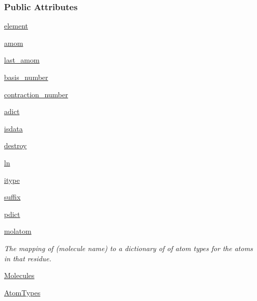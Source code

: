 \subsubsection*{Public Attributes}
\begin{DoxyCompactItemize}
\item 
\hyperlink{classforcebalance_1_1psi4io_1_1GBS__Reader_afa3e259eab3e92b51c2b064f882dd776}{element}
\item 
\hyperlink{classforcebalance_1_1psi4io_1_1GBS__Reader_a322f36949ce67389f107cac80e8f5b40}{amom}
\item 
\hyperlink{classforcebalance_1_1psi4io_1_1GBS__Reader_ae498cfab81dfd12bd0e86037be80135d}{last\-\_\-amom}
\item 
\hyperlink{classforcebalance_1_1psi4io_1_1GBS__Reader_acef6f87327455c97f05e603f9330a0d3}{basis\-\_\-number}
\item 
\hyperlink{classforcebalance_1_1psi4io_1_1GBS__Reader_a77ab2b3c48ee692e3678131c96de9708}{contraction\-\_\-number}
\item 
\hyperlink{classforcebalance_1_1psi4io_1_1GBS__Reader_ac42c3b29532e11a0d8d78b48347739ff}{adict}
\item 
\hyperlink{classforcebalance_1_1psi4io_1_1GBS__Reader_a725975a6e197a132d3c4dba96412f9bb}{isdata}
\item 
\hyperlink{classforcebalance_1_1psi4io_1_1GBS__Reader_a674b528af51d25b0c96da13946d4ea08}{destroy}
\item 
\hyperlink{classforcebalance_1_1BaseReader_a80c8e3bea212600742968aa8669e557b}{ln}
\item 
\hyperlink{classforcebalance_1_1BaseReader_a22ff3f4c684c728e019d801fface36f6}{itype}
\item 
\hyperlink{classforcebalance_1_1BaseReader_a48ef0584a1b6b4b6f8eb741ad8465db8}{suffix}
\item 
\hyperlink{classforcebalance_1_1BaseReader_aaf18c900d6055ed4b5124f6bb26164c1}{pdict}
\item 
\hyperlink{classforcebalance_1_1BaseReader_ab444c213e15929253dd73395ac5f19fc}{molatom}
\begin{DoxyCompactList}\small\item\em The mapping of (molecule name) to a dictionary of of atom types for the atoms in that residue. \end{DoxyCompactList}\item 
\hyperlink{classforcebalance_1_1BaseReader_a4369b5fb663a83b11602daa71db6862e}{Molecules}
\item 
\hyperlink{classforcebalance_1_1BaseReader_a69ca7d949a4a3df4d9f61e617fe0e270}{Atom\-Types}
\end{DoxyCompactItemize}


